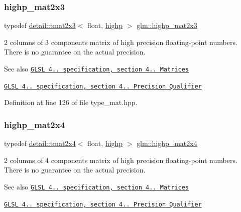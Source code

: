 \subsubsection{\texorpdfstring{highp\+\_\+mat2x3}{highp\_mat2x3}}
{\footnotesize\ttfamily typedef \hyperlink{structglm_1_1detail_1_1tmat2x3}{detail\+::tmat2x3}$<$ float, \hyperlink{namespaceglm_a0f04f086094c747d227af4425893f545ac6f7eab42eacbb10d59a58e95e362074}{highp} $>$ \hyperlink{group__core__precision_ga7d4e5a1c803be5688c75241c924dfa58}{glm\+::highp\+\_\+mat2x3}}

2 columns of 3 components matrix of high precision floating-\/point numbers. There is no guarantee on the actual precision.

\begin{DoxySeeAlso}{See also}
\href{http://www.opengl.org/registry/doc/GLSLangSpec.4.20.8.pdf}{\tt G\+L\+SL 4.. specification, section 4.. Matrices} 

\href{http://www.opengl.org/registry/doc/GLSLangSpec.4.20.8.pdf}{\tt G\+L\+SL 4.. specification, section 4.. Precision Qualifier} 
\end{DoxySeeAlso}


Definition at line 126 of file type\+\_\+mat.\+hpp.

\mbox{\label{group__core__precision_ga3cc506666b7a95db56f9d2eb787b6e20}} 
\subsubsection{\texorpdfstring{highp\+\_\+mat2x4}{highp\_mat2x4}}
{\footnotesize\ttfamily typedef \hyperlink{structglm_1_1detail_1_1tmat2x4}{detail\+::tmat2x4}$<$ float, \hyperlink{namespaceglm_a0f04f086094c747d227af4425893f545ac6f7eab42eacbb10d59a58e95e362074}{highp} $>$ \hyperlink{group__core__precision_ga3cc506666b7a95db56f9d2eb787b6e20}{glm\+::highp\+\_\+mat2x4}}

2 columns of 4 components matrix of high precision floating-\/point numbers. There is no guarantee on the actual precision.

\begin{DoxySeeAlso}{See also}
\href{http://www.opengl.org/registry/doc/GLSLangSpec.4.20.8.pdf}{\tt G\+L\+SL 4.. specification, section 4.. Matrices} 

\href{http://www.opengl.org/registry/doc/GLSLangSpec.4.20.8.pdf}{\tt G\+L\+SL 4.. specification, section 4.. Precision Qualifier} 
\end{DoxySeeAlso}


